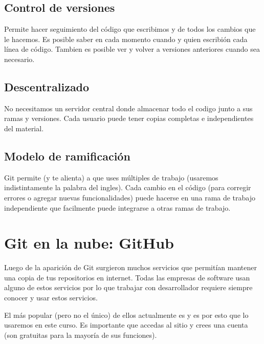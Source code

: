 \documentclass[a4paper,12pt,spanish]{sphinxmanual}
\begin{document}
\section{Control de versiones}
\label{\detokenize{git:control-de-versiones}}
\sphinxAtStartPar
Permite hacer seguimiento del código que
escribimos y de todos los cambios que le hacemos. Es posible saber
en cada momento cuando y quien escribión cada línea de código.
Tambien es posible ver y volver a versiones anteriores cuando sea
necesario.


\section{Descentralizado}
\label{\detokenize{git:descentralizado}}
\sphinxAtStartPar
No necesitamos un servidor central donde almacenar todo el codigo
junto a sus ramas y versiones.
Cada usuario puede tener copias completas e independientes del material.


\section{Modelo de ramificación}
\label{\detokenize{git:modelo-de-ramificacion}}
\sphinxAtStartPar
Git permite (y te alienta) a que uses múltiples  de trabajo
(usaremos indistintamente la palabra  del ingles).
Cada cambio en el código (para corregir errores o agregar nuevas
funcionalidades) puede hacerse en una rama de trabajo independiente
que facilmente puede integrarse a otras ramas de trabajo.

\sphinxstepscope


\chapter{Git en la nube: GitHub}
\label{\detokenize{github:git-en-la-nube-github}}\label{\detokenize{github::doc}}
\sphinxAtStartPar
Luego de la aparición de Git surgieron muchos servicios que
permitían mantener una copia de tus repositorios en internet.
Todas las empresas de software usan alguno de estos servicios
por lo que trabajar con desarrollador requiere siempre conocer
y usar estos servicios.

\sphinxAtStartPar
El más popular (pero no el único) de ellos actualmente es
 y es por esto que lo usaremos
en este curso.
Es importante que accedas al sitio y crees una cuenta (son gratuitas
para la mayoría de sus funciones).
\end{document}
